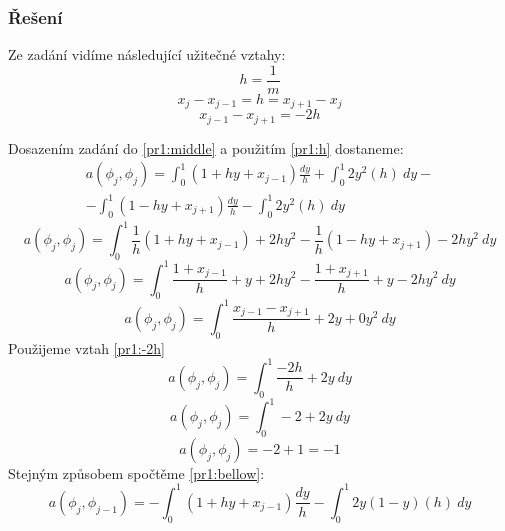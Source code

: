 \documentclass[../main.tex]{subfiles}
\begin{document}
\subsubsection{Řešení}
Ze zadání vidíme následující užitečné vztahy:
\begin{equation}\label{pr1:vztahhm}
    h=\frac{1}{m}
\end{equation}
\begin{equation}\label{pr1:h}
    x_j - x_{j-1} = h = x_{j+1} - x_j
\end{equation}
\begin{equation}\label{pr1:-2h}
    x_{j-1}- x_{j+1} = -2h
\end{equation}


Dosazením zadání do \eqref{pr1:middle} a použitím \eqref{pr1:h} dostaneme:
\begin{multline}
    a(\phi_j, \phi_j) = \int_0^1 \left( 1 + hy + x_{j-1}\right) \frac{dy}{h} + \int_0^1 2 y^2 (h) \ dy -\\- \int_0^1 (1 -hy + x_{j+1}) \frac{dy}{ h} - \int_0^1 2 y^2 (h) \ dy
\end{multline}
\begin{equation}
    a(\phi_j, \phi_j) = \int_0^1 \frac{1}{h}\left( 1 + hy + x_{j-1}\right)  +  2h y^2   -  \frac{1}{ h}(1 -hy + x_{j+1})  - 2h y^2 \ dy
\end{equation}
\begin{equation}
    a(\phi_j, \phi_j) = \int_0^1 \frac{1 + x_{j-1}}{h}  + y +  2h y^2   -  \frac{1+ x_{j+1}}{ h} + y   - 2h y^2 \ dy
\end{equation}
\begin{equation}
    a(\phi_j, \phi_j) = \int_0^1 \frac{x_{j-1}- x_{j+1}}{h}  + 2y +  0 y^2 \ dy
\end{equation}
Použijeme vztah \eqref{pr1:-2h}
\begin{equation}
    a(\phi_j, \phi_j) = \int_0^1 \frac{-2h}{h}  + 2y \ dy
\end{equation}
\begin{equation}
    a(\phi_j, \phi_j) = \int_0^1 -2  + 2y \ dy
\end{equation}
\begin{equation}
    a(\phi_j, \phi_j) = -2  + 1 = -1
\end{equation}
Stejným způsobem spočtěme \eqref{pr1:bellow}:
\begin{equation}
    a(\phi_j, \phi_{j-1}) = - \int_0^1 (1+hy + x_{j-1}) \frac{dy}{h} - \int_0^1 2 y(1-y) (h) \ dy
\end{equation}
\end{document}
